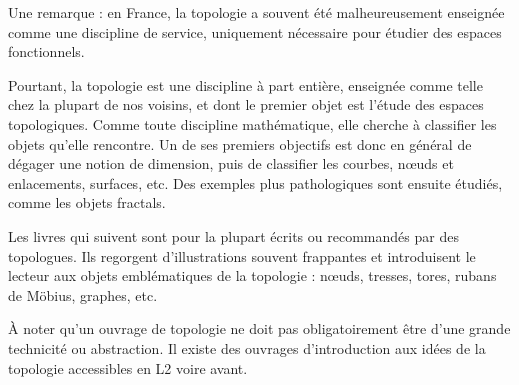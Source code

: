 \documentclass{article}
\begin{document}
Une remarque : en France, la topologie a souvent été malheureusement enseignée comme une discipline de service, uniquement nécessaire pour étudier des espaces fonctionnels.

Pourtant, la topologie est une discipline à part entière, enseignée comme telle chez la plupart de nos voisins, et dont le premier objet est l'étude des espaces topologiques. 
Comme toute discipline mathématique, elle cherche à classifier les objets qu'elle rencontre. Un de ses premiers objectifs est donc en général de dégager une notion de dimension, puis de classifier les courbes, n\oe uds et enlacements, surfaces, etc. Des exemples plus pathologiques sont ensuite étudiés, comme les objets fractals.

Les livres qui suivent sont pour la plupart écrits ou recommandés par des topologues. Ils regorgent d'illustrations souvent frappantes et introduisent le lecteur aux objets emblématiques de la topologie : n\oe uds, tresses, tores, rubans de Möbius, graphes, etc.

À noter qu'un ouvrage de topologie ne doit pas obligatoirement être d'une grande technicité ou abstraction. Il existe des ouvrages d'introduction aux idées de la topologie accessibles en L2 voire avant.
\end{document}
